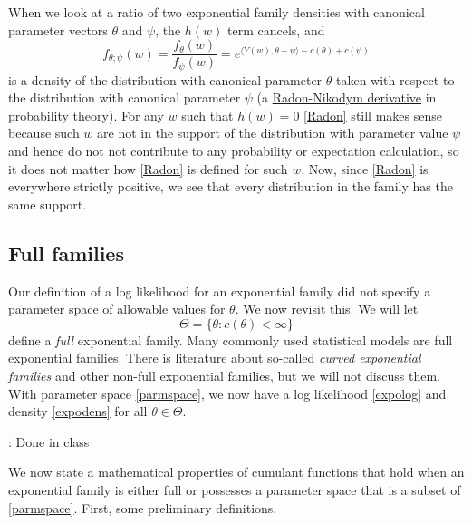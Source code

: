 \documentclass[
]{article}
\begin{document}
When we look at a ratio of two exponential family densities with
canonical parameter vectors \(\theta\) and \(\psi\), the \(h(w)\) term
cancels, and \begin{equation} \label{Radon}
  f_{\theta;\psi}(w) = \frac{f_{\theta}(w)}{f_{\psi}(w)} = e^{\langle Y(w),\theta - \psi \rangle - c(\theta) + c(\psi)} 
\end{equation} is a density of the distribution with canonical parameter
\(\theta\) taken with respect to the distribution with canonical
parameter \(\psi\) (a
\href{https://en.wikipedia.org/wiki/Radon\%E2\%80\%93Nikodym_theorem}{Radon-Nikodym
derivative} in probability theory). For any \(w\) such that \(h(w) = 0\)
\eqref{Radon} still makes sense because such \(w\) are not in the
support of the distribution with parameter value \(\psi\) and hence do
not not contribute to any probability or expectation calculation, so it
does not matter how \eqref{Radon} is defined for such \(w\). Now, since
\eqref{Radon} is everywhere strictly positive, we see that every
distribution in the family has the same support.

\hypertarget{full-families}{%
\subsection{Full families}\label{full-families}}

Our definition of a log likelihood for an exponential family did not
specify a parameter space of allowable values for \(\theta\). We now
revisit this. We will let \begin{equation} \label{parmspace}
  \Theta = \{ \theta : c(\theta) < \infty \}
\end{equation} define a \emph{full} exponential family. Many commonly
used statistical models are full exponential families. There is
literature about so-called \emph{curved exponential families} and other
non-full exponential families, but we will not discuss them. With
parameter space \eqref{parmspace}, we now have a log likelihood
\eqref{expolog} and density \eqref{expodens} for all
\(\theta \in \Theta\).

\vspace{0.5cm}

: Done in class

We now state a mathematical properties of cumulant functions that hold
when an exponential family is either full or possesses a parameter space
that is a subset of \eqref{parmspace}. First, some preliminary
definitions.
\end{document}
